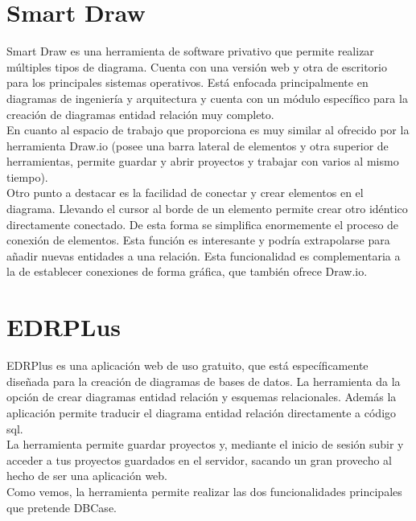 \section{Smart Draw}
Smart Draw \cite{smartdraw} es una herramienta de software privativo que permite realizar múltiples tipos de diagrama. Cuenta con una versión web y otra de escritorio para los principales sistemas operativos. Está enfocada principalmente en diagramas de ingeniería y arquitectura y cuenta con un módulo específico para la creación de diagramas entidad relación muy completo.\\

En cuanto al espacio de trabajo que proporciona es muy similar al ofrecido por la herramienta Draw.io (posee una barra lateral de elementos y otra superior de herramientas, permite guardar y abrir proyectos y trabajar con varios al mismo tiempo).\\

Otro punto a destacar es la facilidad de conectar y crear elementos en el diagrama. Llevando el cursor al borde de un elemento permite crear otro idéntico directamente conectado. De esta forma se simplifica enormemente el proceso de conexión de elementos. Esta función es interesante y podría extrapolarse para añadir nuevas entidades a una relación. Esta funcionalidad es complementaria a la de establecer conexiones de forma gráfica, que también ofrece Draw.io.
\section{EDRPLus}
EDRPlus \cite{edrplus} es una aplicación web de uso gratuito, que está específicamente diseñada para la creación de diagramas de bases de datos. La herramienta da la opción de crear diagramas entidad relación y esquemas relacionales. Además la aplicación permite traducir el diagrama entidad relación directamente a código sql.\\

La herramienta permite guardar proyectos y, mediante el inicio de sesión subir y acceder a tus proyectos guardados en el servidor, sacando un gran provecho al hecho de ser una aplicación web.\\

Como vemos, la herramienta permite realizar las dos funcionalidades principales que pretende DBCase.\\

